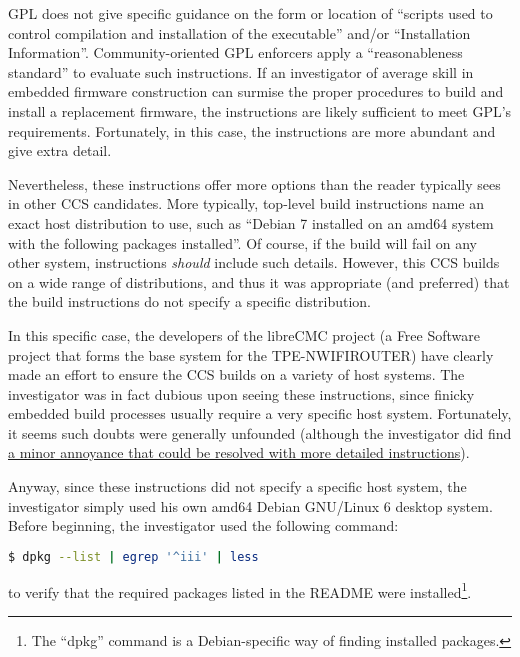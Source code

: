 GPL does not give specific guidance on the form or location of
``scripts used to control compilation and installation of the executable''
and/or ``Installation Information''.  Community-oriented GPL enforcers apply a
``reasonableness standard'' to evaluate such instructions.  If an investigator of
average skill in embedded firmware construction can surmise the proper
procedures to build and install a replacement firmware, the instructions are
likely sufficient to meet GPL's requirements.  Fortunately, in this case, the
instructions are more abundant and give extra detail.

Nevertheless, these instructions offer more options than the reader
typically sees in other CCS candidates.  More typically, top-level build
instructions name an exact host distribution to use, such as
``Debian 7 installed on an amd64 system with the following packages
installed''.  Of course, if the build will fail on any other system,
instructions \textit{should} include such details.  However, this CCS builds
on a wide range of distributions, and thus it was appropriate (and preferred)
that the build instructions do not  specify a specific distribution.

\label{thinkpenguin-specific-host-system}

In this specific case, the developers of the libreCMC project (a Free
Software project that forms the base system for the TPE-NWIFIROUTER) have
clearly made an effort to ensure the CCS builds on a variety of host systems.
The investigator was in fact dubious upon seeing these instructions, since
finicky embedded build processes usually require a very specific host system.
Fortunately, it seems such doubts were generally unfounded (although the
investigator did find
\hyperref[thinkpenguin-glibc-214-issue]{a minor annoyance that could be
  resolved with more detailed instructions}).

Anyway, since these instructions did not specify a specific host system, the
investigator simply used his own amd64 Debian GNU/Linux 6 desktop system.  Before
beginning, the investigator used the following command:

\lstset{tabsize=2}
\begin{lstlisting}[language=bash]
$ dpkg --list | egrep '^iii' | less
\end{lstlisting}

to verify that the required packages listed in the README were
installed\footnote{The ``dpkg'' command is a Debian-specific way of
  finding installed packages.}.



